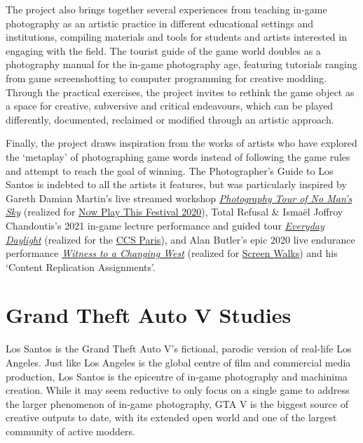 \documentclass[
  openany]{book}
\begin{document}
The project also brings together several experiences from teaching in-game photography as an artistic practice in different educational settings and institutions, compiling materials and tools for students and artists interested in engaging with the field. The tourist guide of the game world doubles as a photography manual for the in-game photography age, featuring tutorials ranging from game screenshotting to computer programming for creative modding. Through the practical exercises, the project invites to rethink the game object as a space for creative, subversive and critical endeavours, which can be played differently, documented, reclaimed or modified through an artistic approach.

Finally, the project draws inspiration from the works of artists who have explored the `metaplay' of photographing game words instead of following the game rules and attempt to reach the goal of winning. The Photographer's Guide to Los Santos is indebted to all the artists it features, but was particularly inspired by Gareth Damian Martin's live streamed workshop \href{https://www.twitch.tv/videos/591840067}{\emph{Photography Tour of No Man's Sky}} (realized for \href{https://www.somersethouse.org.uk/whats-on/now-play-this-2020}{Now Play This Festival 2020}), Total Refusal \& Ismaël Joffroy Chandoutis's 2021 in-game lecture performance and guided tour \href{https://vimeo.com/506064357}{\emph{Everyday Daylight}} (realized for the \href{https://ccsparis.com/en/events/total-refusal-digital-disarmament-movement-a-la-gaite-lyrique/}{CCS Paris}), and Alan Butler's epic 2020 live endurance performance \href{https://www.youtube.com/watch?v=R4Q2G6tOQ_Q}{\emph{Witness to a Changing West}} (realized for \href{https://screenwalks.com/}{Screen Walks}) and his `Content Replication Assignments'.

\hypertarget{grand-theft-auto-v-studies}{%
\section*{Grand Theft Auto V Studies}\label{grand-theft-auto-v-studies}}

Los Santos is the Grand Theft Auto V's fictional, parodic version of real-life Los Angeles. Just like Los Angeles is the global centre of film and commercial media production, Los Santos is the epicentre of in-game photography and machinima creation. While it may seem reductive to only focus on a single game to address the larger phenomenon of in-game photography, GTA V is the biggest source of creative outputs to date, with its extended open world and one of the largest community of active modders.
\end{document}
